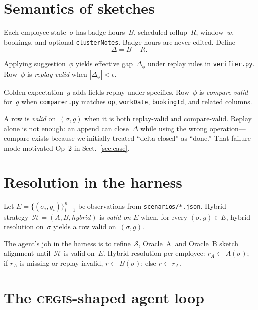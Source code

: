 \documentclass[11pt]{article}
\begin{document}
\section{Semantics of sketches}
\label{sec:semantics}

Each employee state~$\sigma$ has badge hours~$B$, scheduled rollup~$R$, window~$w$,
bookings, and optional \texttt{clusterNotes}. Badge hours are never edited. Define
\begin{equation}
  \Delta = B - R .
\end{equation}

Applying suggestion~$\phi$ yields effective gap~$\Delta_\phi$ under replay rules in
\texttt{verifier.py}. Row~$\phi$ is \emph{replay-valid} when $|\Delta_\phi| < \epsilon$.

Golden expectation~$g$ adds fields replay under-specifies. Row~$\phi$ is \emph{compare-valid}
for~$g$ when \texttt{comparer.py} matches \texttt{op}, \texttt{workDate},
\texttt{bookingId}, and related columns.

A row is \emph{valid} on~$(\sigma, g)$ when it is both replay-valid and compare-valid.
Replay alone is not enough: an append can close~$\Delta$ while using the wrong
operation---compare exists because we initially treated ``delta closed'' as ``done.'' That
failure mode motivated Op~2 in Sect.~\ref{sec:case}.

\section{Resolution in the harness}
\label{sec:resolution}

Let $E = \{(\sigma_i, g_i)\}_{i=1}^n$ be observations from \texttt{scenarios/*.json}.
Hybrid strategy~$\mathcal{H} = (A, B, \mathit{hybrid})$ is \emph{valid on $E$} when, for
every $(\sigma, g) \in E$, hybrid resolution on~$\sigma$ yields a row valid on~$(\sigma, g)$.

The agent's job in the harness is to refine~$\mathcal{S}$, Oracle~A, and Oracle~B sketch
alignment until~$\mathcal{H}$ is valid on~$E$. Hybrid resolution per employee:
$r_A \leftarrow A(\sigma)$; if $r_A$ is missing or replay-invalid, $r \leftarrow B(\sigma)$;
else $r \leftarrow r_A$.

\section{The \textsc{cegis}-shaped agent loop}
\label{sec:cegis}
\end{document}

